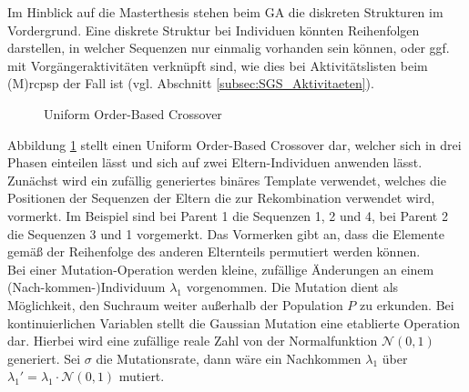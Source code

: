 Im Hinblick auf die Masterthesis stehen beim \ac{GA} die diskreten Strukturen im Vordergrund. Eine diskrete Struktur bei Individuen könnten Reihenfolgen darstellen, in welcher Sequenzen nur einmalig vorhanden sein können\cite[vgl.][S. 151]{siarry_metaheuristics_2016}, oder ggf. mit Vorgängeraktivitäten verknüpft sind, wie dies bei Aktivitätslisten beim (M)\ac{rcpsp} der Fall ist (vgl. Abschnitt \ref{subsec:SGS_Aktivitaeten}). \\

\begin{figure}[H]
    \centering
    \noindent{}
    \caption{Uniform Order-Based Crossover} 
    \label{img:ga_uniformcrossover}
\end{figure}

Abbildung \ref{img:ga_uniformcrossover} stellt einen Uniform Order-Based Crossover dar, welcher sich in drei Phasen einteilen lässt und sich auf zwei Eltern-Individuen anwenden lässt. Zunächst wird ein zufällig generiertes binäres Template verwendet, welches die Positionen der Sequenzen der Eltern die zur Rekombination verwendet wird, vormerkt. Im Beispiel sind bei Parent 1 die Sequenzen 1, 2 und 4, bei Parent 2 die Sequenzen 3 und 1 vorgemerkt. Das Vormerken gibt an, dass die Elemente gemäß der Reihenfolge des anderen Elternteils permutiert werden können. \cite[vgl.][S. 151]{siarry_metaheuristics_2016} \\ 


Bei einer Mutation-Operation werden kleine, zufällige Änderungen an einem (Nach-kommen-)Individuum $\lambda_1$ vorgenommen. Die Mutation dient als Möglichkeit, den Suchraum weiter außerhalb der Population $P$ zu erkunden. Bei kontinuierlichen Variablen stellt die Gaussian Mutation eine etablierte Operation dar. Hierbei wird eine zufällige reale Zahl von der Normalfunktion $\mathcal{N}(0, 1)$ generiert. Sei $\sigma$ die Mutationsrate, dann wäre ein Nachkommen $\lambda_1$ über $\lambda_1' = \lambda_1 \cdot \mathcal{N}(0, 1)$ mutiert. \cite[vgl.][S. 13 f.]{kramer_genetic_2017}\\

